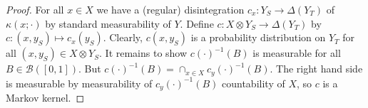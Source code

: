 \begin{proof}




For all $x\in X$ we have a (regular) disintegration $c_x:Y_S\to \Delta(Y_T)$ of $\kappa(x;\cdot)$ by standard measurability of $Y$. Define $c:X\otimes Y_S\to \Delta(Y_T)$ by $c:(x,y_S)\mapsto c_x(y_S)$. Clearly, $c(x,y_S)$ is a probability distribution on $Y_T$ for all $(x,y_S)\in X\otimes Y_S$. It remains to show $c(\cdot)^{-1}(B)$ is measurable for all $B\in \mathcal{B}([0,1])$. But $c(\cdot)^{-1}(B) = \cap_{x\in X} c_y(\cdot)^{-1}(B)$. The right hand side is measurable by measurability of $c_y(\cdot)^{-1}(B)$ countability of $X$, so $c$ is a Markov kernel. 


\end{proof}
